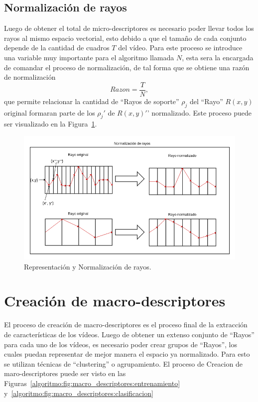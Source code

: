 		
	\subsection{Normalización de rayos}
	\label{algoritmo:normalizacion}
	Luego de obtener el total de micro-descriptores es necesario poder llevar todos los rayos al mismo espacio vectorial, esto debido a que el tamaño de cada conjunto depende de la cantidad de cuadros $T$ del vídeo. Para este proceso se introduce una variable muy importante para el algoritmo llamada $N$, esta sera la encargada de comandar el proceso de normalización, de tal forma que se obtiene una razón de normalización
	\begin{equation}
		Razon = \frac{T}{N},
	\end{equation}
	que permite relacionar la cantidad de ``Rayos de soporte'' $\rho_j$ del ``Rayo'' $R(x,y)$ original formaran parte de los $\rho_j '$ de $R(x,y)'$' normalizado. Este proceso puede ser visualizado en la Figura~\ref{algoritmo:fig:normalizacion}.
	
	\begin{figure}[bt]
		\centering
    		\includegraphics[width=1\textwidth]{Figuras/Diagramas/normalizacion_de_rayos.png}
  		\caption{Representación y Normalización de rayos.}
  		\label{algoritmo:fig:normalizacion}
	\end{figure}	

	
\newpage	
\section{Creación de macro-descriptores}
\label{sec:macro-descriptores}
El proceso de creación de macro-descriptores es el proceso final de la extracción de características de los vídeos. Luego de obtener un extenso conjunto de ``Rayos'' para cada uno de los vídeos, es necesario poder crear grupos de ``Rayos'', los cuales puedan representar de mejor manera el espacio ya normalizado. Para esto se utilizan técnicas de ``clustering'' o agrupamiento. El proceso de Creacion de maro-descriptores puede ser visto en las Figuras~\ref{algoritmo:fig:macro_descriptores:entrenamiento} y~\ref{algoritmo:fig:macro_descriptores:clasificacion}

